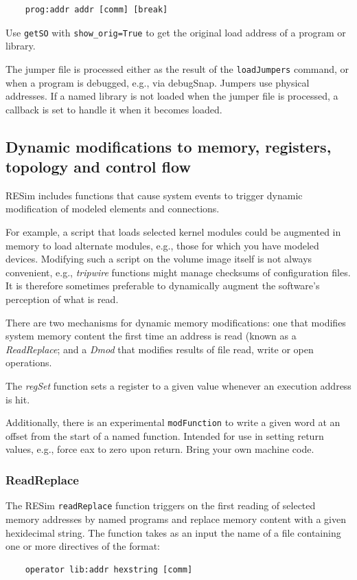 \documentclass[titlepage]{article}
\begin{document}
\begin{verbatim}
    prog:addr addr [comm] [break]
\end{verbatim}
Use {\tt getSO} with {\tt show\_orig=True} to get the original load address of a program or library.

The jumper file is processed either as the result of the {\tt loadJumpers} command, or when a program
is debugged, e.g., via debugSnap.  Jumpers use physical addresses.  If a named library is not loaded 
when the jumper file is processed, a callback is set to handle it when it becomes loaded.  

\subsection{Dynamic modifications to memory, registers, topology and control flow}
\label{dmod}
RESim includes functions that cause system events to trigger dynamic modification of modeled elements and connections.

For example, a script that loads selected kernel modules could be augmented in memory to
load alternate modules, e.g., those for which you have modeled devices.  Modifying such a script on the volume
image itself is not always convenient, e.g., \textit{tripwire} functions might manage checksums of
configuration files.  It is therefore sometimes preferable to dynamically augment the software's perception of what is read.

There are two mechanisms for dynamic memory modifications: one that modifies system memory content the first time an address is
read (known as a \textit{ReadReplace}; and a \textit{Dmod} that modifies results of file read, write or open operations.

The \textit{regSet} function sets a register to a given value whenever an execution address is hit.

Additionally, there is an experimental {\tt modFunction} to write a given word at an offset from the start of a named function.  
Intended for use in setting return values, e.g., force eax to zero upon return.  Bring your own machine code.  

\subsubsection{ReadReplace}
\label{read-replace}
The RESim {\tt readReplace} function triggers on the first reading of selected memory addresses
by named programs and replace memory content with a given hexidecimal string.  The function takes as an
input the name of a file containing one or more directives of the format:
\begin{verbatim}
    operator lib:addr hexstring [comm]
\end{verbatim}
\end{document}
